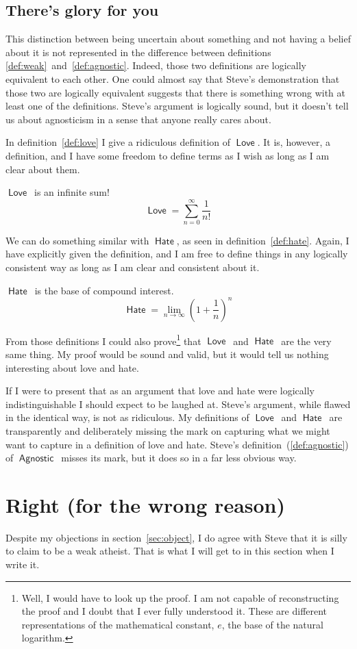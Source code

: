 \documentclass[12pt]{article}
\newcommand{\rel}[1]{\ensuremath{\mathop{\mathsf{#1}}}}
\newcommand{\rlagno}{\rel{Agnostic}}
\newcommand{\rllove}{\rel{Love}}
\newcommand{\rlhate}{\rel{Hate}}
\begin{document}
\subsection{There's glory for you}

This distinction between being uncertain about something and not having a belief about it
is not represented in the difference between definitions \ref{def:weak}~and~\ref{def:agnostic}.
Indeed, those two definitions are logically equivalent to each other.
One could almost say that Steve's demonstration that those two are logically equivalent suggests that there is something wrong with at least one of the definitions.
Steve's argument is logically sound, but it doesn't tell us about agnosticism in a sense that anyone really cares about.

In definition~\ref{def:love} I give a ridiculous definition of \rllove.
It is, however, a definition, and I have some freedom to define terms as I wish as long as I am clear about them.

\begin{definition}\label{def:love}
    \rllove\ is an infinite sum!
    \[
     \rllove = \sum_{n=0}^\infty \frac{1}{n!}   
    \]   
\end{definition}

We can do something similar with \rlhate, as seen in definition~\ref{def:hate}.
Again, I have explicitly given the definition, and I am free to define things in any logically consistent way as long as I am clear and consistent about it.

\begin{definition}\label{def:hate}
    \rlhate\ is the base of compound interest.
    \[
     \rlhate =  \lim_{n \to \infty}\left( 1 + \frac{1}{n}\right)^n 
    \]   
\end{definition}

From those definitions I could also prove\footnote{%
    Well, I would have to look up the proof.
    I am not capable of reconstructing the proof and I doubt that I ever fully understood it.
    These are different representations of the mathematical constant,
    $e$, the base of the natural logarithm.}
that \rllove\ and \rlhate\ are the very same thing.
My proof would be sound and valid, but it would tell us nothing interesting about love and hate.

If I were to present that as an argument that love and hate were logically indistinguishable I should expect to be laughed at.
Steve's argument, while flawed in the identical way, is not as ridiculous.
My definitions of \rllove\ and \rlhate\ are transparently and deliberately missing the mark on capturing what we might want to capture in a definition of love and hate.
Steve's definition~(\ref{def:agnostic}) of \rlagno\ misses its mark,
but it does so in a far less obvious way.

\section{Right (for the wrong reason)}

Despite my objections in section~\ref{sec:object}, I do agree with Steve that it is silly to claim to be a weak atheist. That is what I will get to in this section when I write it.
\end{document}
